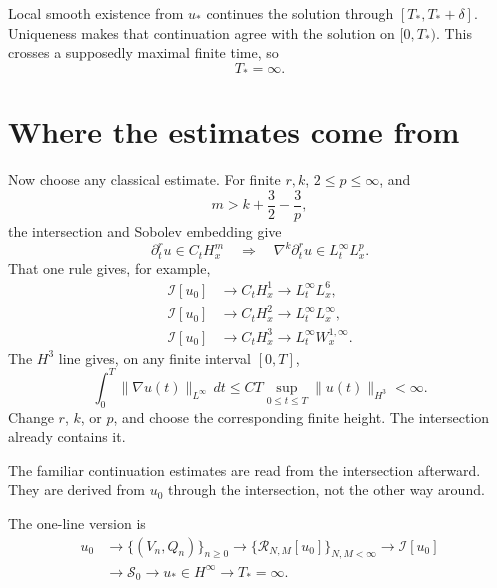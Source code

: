 \documentclass[12pt]{article}
\newcommand{\I}{\mathcal I}
\begin{document}
Local smooth existence from \(u_*\) continues the solution through
\([T_*,T_*+\delta]\). Uniqueness makes that continuation agree with the
solution on \([0,T_*)\). This crosses a supposedly maximal finite time, so
\[
  T_* = \infty.
\]

\section*{Where the estimates come from}

Now choose any classical estimate. For finite \(r,k\), \(2\leq p\leq\infty\),
and
\[
  m>k+\frac32-\frac3p,
\]
the intersection and Sobolev embedding give
\[
  \partial_t^ru\in C_tH_x^m
  \quad\Longrightarrow\quad
  \nabla^k\partial_t^ru
  \in L_t^\infty L_x^p.
\]
That one rule gives, for example,
\[
\begin{aligned}
  \I[u_0]
  &\longrightarrow C_tH_x^1
  \longrightarrow L_t^\infty L_x^6,
  \\
  \I[u_0]
  &\longrightarrow C_tH_x^2
  \longrightarrow L_t^\infty L_x^\infty,
  \\
  \I[u_0]
  &\longrightarrow C_tH_x^3
  \longrightarrow L_t^\infty W_x^{1,\infty}.
\end{aligned}
\]
The \(H^3\) line gives, on any finite interval \([0,T]\),
\[
  \int_0^T\|\nabla u(t)\|_{L^\infty}\,dt
  \leq
  CT
  \sup_{0\leq t\leq T}\|u(t)\|_{H^3}
  <\infty.
\]
Change \(r\), \(k\), or \(p\), and choose the corresponding finite height. The
intersection already contains it.

The familiar continuation estimates are read from the intersection afterward.
They are derived from \(u_0\) through the intersection, not the other way
around.

The one-line version is
\[
\begin{aligned}
  u_0
  &\longrightarrow
  \{(V_n,Q_n)\}_{n\geq0}
  \longrightarrow
  \{\mathcal R_{N,M}[u_0]\}_{N,M<\infty}
  \longrightarrow
  \I[u_0]
  \\
  &\longrightarrow
  \mathscr S_0
  \longrightarrow
  u_*\in H^\infty
  \longrightarrow
  T_*=\infty.
\end{aligned}
\]
\end{document}
